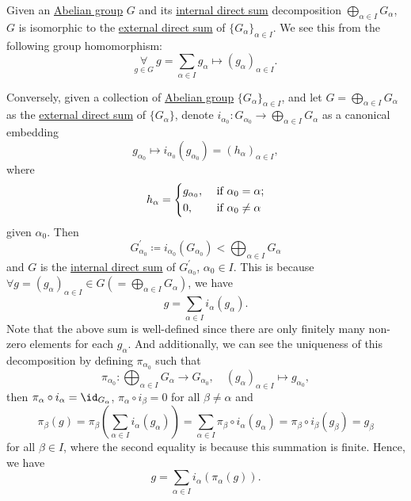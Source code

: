 \begin{remark}\label{rmk:relation-between-internal-and-externam-direct-sum}
	Given an \hyperref[def:Abelian-group]{Abelian group} \(G\) and its \hyperref[def:internal-direct-sum]{internal direct sum} decomposition \(\bigoplus_{\alpha \in I}G_\alpha \),
	\(G\) is isomorphic to the \hyperref[def:external-direct-sum]{external direct sum} of \(\{G_\alpha \}_{\alpha \in I}\). We see this from the following group homomorphism:
	\[
		\underset{g\in G}{\forall }\ g = \sum\limits_{\alpha \in I}g_\alpha \mapsto (g_\alpha )_{\alpha \in I}.
	\]

	Conversely, given a collection of \hyperref[def:Abelian-group]{Abelian group} \(\{G_\alpha \}_{\alpha \in I}\), and let \(G = \bigoplus_{\alpha \in I}G_\alpha \) as the
	\hyperref[def:external-direct-sum]{external direct sum} of \(\{G_\alpha \}\), denote
	\(i_{\alpha_0 }\colon G_{\alpha_0} \to \bigoplus_{\alpha \in I}G_\alpha\)
	as a canonical embedding
	\[
		g_{ \alpha_0 }\mapsto i_{ \alpha_0 } (g_{ \alpha_0 }) = (h_\alpha)_{\alpha\in I},
	\]
	where
	\[
		h_\alpha  = \begin{dcases}
			g_{ \alpha_0 }, & \text{ if } \alpha_0 = \alpha  ; \\
			0,              & \text{ if } \alpha_0 \neq \alpha
		\end{dcases}
	\]
	given \(\alpha_0\). Then
	\[
		G_{\alpha_0} ^\prime \coloneqq i_{\alpha_0} (G_{\alpha_0}) < \bigoplus _{\alpha \in I}G_\alpha
	\]
	and \(G\) is the \hyperref[def:internal-direct-sum]{internal direct sum} of \(G^\prime _{\alpha_0} \), \(\alpha_0\in I\). This is because
	\(\forall g= (g_\alpha )_{\alpha \in I}\in G(= \bigoplus_{\alpha \in I}G_\alpha )\), we have
	\[
		g = \sum\limits_{\alpha \in I} i_\alpha (g_\alpha ).
	\]
	Note that the above sum is well-defined since there are only finitely many non-zero elements for each \(g_\alpha \). And additionally, we can
	see the uniqueness of this decomposition by defining \(\pi _{\alpha_0} \) such that
	\[
		\pi _{\alpha_0} \colon \bigoplus_{\alpha \in I}G_\alpha \to G_{\alpha_0} , \quad (g_\alpha )_{\alpha \in I}\mapsto g_{\alpha_0} ,
	\]
	then \(\pi _\alpha \circ i_\alpha = \id_{G_\alpha } \), \(\pi _\alpha \circ i_\beta = 0\) for all \(\beta \neq \alpha \) and
	\[
		\pi _\beta (g) = \pi _\beta \left(\sum\limits_{\alpha \in I}^{}i_\alpha (g_\alpha ) \right) = \sum\limits_{\alpha \in I}\pi _\beta \circ i_\alpha (g_\alpha ) = \pi _\beta \circ i_\beta (g_\beta ) = g_\beta
	\]
	for all \(\beta \in I\), where the second equality is because this summation is finite. Hence, we have
	\[
		g = \sum\limits_{\alpha \in I}i_\alpha (\pi _\alpha (g)).
	\]
\end{remark}

